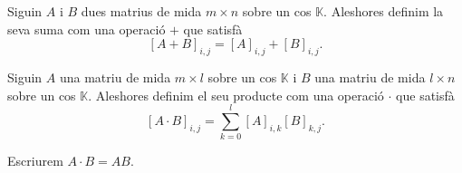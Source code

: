 \documentclass[../Apunts.tex]{subfiles}
\begin{document}
	\begin{definition}
		\label{def:suma de matrius}
		Siguin \(A\) i \(B\) dues matrius de mida \(m\times n\) sobre un cos \(\mathbb{K}\). Aleshores definim la seva suma com una operació \(+\) que satisfà
		\[[A+B]_{i,j}=[A]_{i,j}+[B]_{i,j}.\]
	\end{definition}
	\begin{definition}
		\label{def:producte de matrius}
		Siguin \(A\) una matriu de mida \(m\times l\) sobre un cos \(\mathbb{K}\) i \(B\) una matriu de mida \(l\times n\) sobre un cos \(\mathbb{K}\). Aleshores definim el seu producte com una operació \(\cdot\) que satisfà
		\[[A\cdot B]_{i,j}=\sum_{k=0}^{l}[A]_{i,k}[B]_{k,j}.\]
		
		Escriurem \(A\cdot B=AB\).
	\end{definition}
\end{document}
